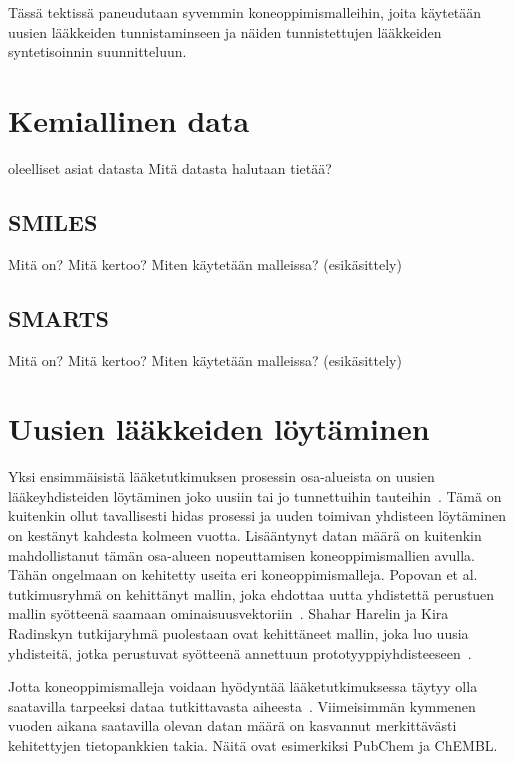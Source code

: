 \documentclass[finnish,twoside,censored,tkt,sw-line]{HYthesisML}
\begin{document}
Tässä tektissä paneudutaan syvemmin koneoppimismalleihin, joita käytetään uusien lääkkeiden tunnistaminseen ja näiden tunnistettujen lääkkeiden syntetisoinnin suunnitteluun.

\chapter{Kemiallinen data}

oleelliset asiat datasta
Mitä datasta halutaan tietää?

\section{SMILES}
Mitä on?
Mitä kertoo?
Miten käytetään malleissa? (esikäsittely)

\section{SMARTS}
Mitä on?
Mitä kertoo?
Miten käytetään malleissa? (esikäsittely)

\chapter{Uusien lääkkeiden löytäminen}


Yksi ensimmäisistä lääketutkimuksen prosessin osa-alueista on uusien lääkeyhdisteiden löytäminen joko uusiin tai jo tunnettuihin tauteihin~\cite{EkinsSean2019Emlf}.
Tämä on kuitenkin ollut tavallisesti hidas prosessi ja uuden toimivan yhdisteen löytäminen on kestänyt kahdesta kolmeen vuotta.
Lisääntynyt datan määrä on kuitenkin mahdollistanut tämän osa-alueen nopeuttamisen koneoppimismallien avulla.
Tähän ongelmaan on kehitetty useita eri koneoppimismalleja.
Popovan et al. tutkimusryhmä on kehittänyt mallin, joka ehdottaa uutta yhdistettä perustuen mallin syötteenä saamaan ominaisuusvektoriin~\cite{PopovaMariya2018Drlf}.
Shahar Harelin ja Kira Radinskyn tutkijaryhmä puolestaan ovat kehittäneet mallin, joka luo uusia yhdisteitä, jotka perustuvat syötteenä annettuun prototyyppiyhdisteeseen~\cite{ShaharHarelAndKiraRadinsky}.

Jotta koneoppimismalleja voidaan hyödyntää lääketutkimuksessa täytyy olla saatavilla tarpeeksi dataa tutkittavasta aiheesta~\cite{EkinsSean2019Emlf}.
Viimeisimmän kymmenen vuoden aikana saatavilla olevan datan määrä on kasvannut merkittävästi kehitettyjen tietopankkien takia.
Näitä ovat esimerkiksi PubChem ja ChEMBL.
\end{document}
